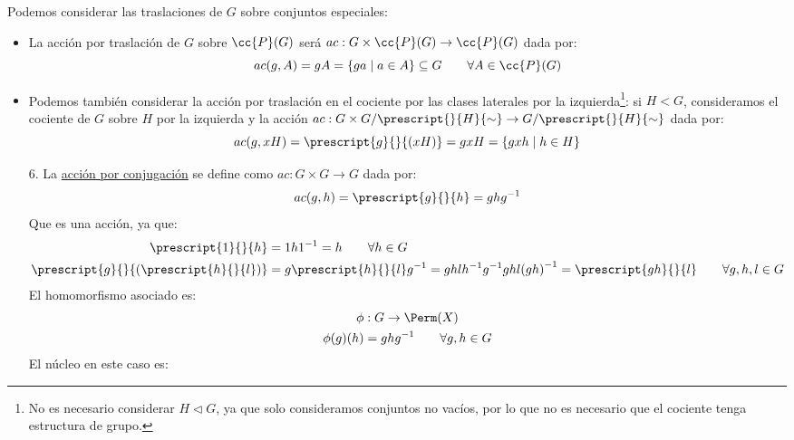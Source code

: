 \begin{ejemplo}
    Podemos considerar las traslaciones de $G$ sobre conjuntos especiales:
    \begin{itemize}
        \item La acción por traslación de $G$ sobre $\cc{P}(G)$ será $ac:G\times \cc{P}(G) \to \cc{P}(G)$ dada por:
            \begin{equation*}
                ac(g,A) = gA = \{ga \mid a\in A\}  \subseteq G \qquad \forall A\in \cc{P}(G)
            \end{equation*}
        \item Podemos también considerar la acción por traslación en el cociente por las clases laterales por la izquierda\footnote{No es necesario considerar $H\lhd G$, ya que solo consideramos conjuntos no vacíos, por lo que no es necesario que el cociente tenga estructura de grupo.}: si $H<G$, consideramos el cociente de $G$ sobre $H$ por la izquierda y la acción $ac:G\times G/\prescript{}{H}{\sim} \to G/\prescript{}{H}{\sim}$ dada por:
            \begin{equation*}
                ac(g,xH) = \prescript{g}{}{(xH)} = gxH  = \{gxh \mid h\in H\}
            \end{equation*}
    \end{itemize}
    \begin{enumerate}
        \item[6.] La \underline{acción por conjugación} se define como $ac:G\times G\to G$ dada por:
            \begin{equation*}
                ac(g,h) = \prescript{g}{}{h} = ghg^{-1}
            \end{equation*}
            Que es una acción, ya que:
            \begin{align*}
                \prescript{1}{}{h} &= 1h1^{-1} = h \qquad \forall h\in G\\
                \prescript{g}{}{(\prescript{h}{}{l})} &= g\prescript{h}{}{l}g^{-1} = ghlh^{-1}g^{-1} ghl{(gh)}^{-1} = \prescript{gh}{}{l} \qquad \forall g,h,l \in G
            \end{align*}
            El homomorfismo asociado es:
            \begin{gather*}
                \phi:G\to\Perm(X) \\
                \phi(g)(h) = ghg^{-1} \qquad \forall g,h\in G
            \end{gather*}
            El núcleo en este caso es:
            \begin{equation*}

\end{equation*}
\end{enumerate}
\end{ejemplo}
